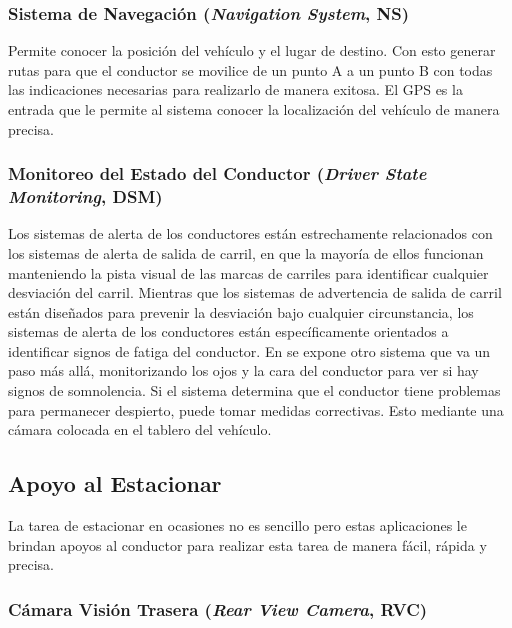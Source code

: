 \subsubsection{Sistema de Navegación {\footnotesize(\textit{Navigation System}, NS)}}

Permite conocer la posición del vehículo y el lugar de destino. Con esto generar rutas para que el conductor se movilice de un punto A a un punto B con todas las indicaciones necesarias para realizarlo de manera exitosa. El GPS es la entrada que le permite al sistema conocer la localización del vehículo de manera precisa.

\subsubsection{Monitoreo del Estado del Conductor {\footnotesize(\textit{Driver State Monitoring}, DSM)}}

Los sistemas de alerta de los conductores están estrechamente relacionados con los sistemas de alerta de salida de carril, en que la mayoría de ellos funcionan manteniendo la pista visual de las marcas de carriles para identificar cualquier desviación del carril. Mientras que los sistemas de advertencia de salida de carril están diseñados para prevenir la desviación bajo cualquier circunstancia, los sistemas de alerta de los conductores están específicamente orientados a identificar signos de fatiga del conductor. En \cite{Velez2015} se expone otro sistema que va un paso más allá, monitorizando los ojos y la cara del conductor para ver si hay signos de somnolencia. Si el sistema determina que el conductor tiene problemas para permanecer despierto, puede tomar medidas correctivas. Esto mediante una cámara colocada en el tablero del vehículo.


\subsection{Apoyo al Estacionar}

La tarea de estacionar en ocasiones no es sencillo pero estas aplicaciones le brindan apoyos al conductor para realizar esta tarea de manera fácil, rápida y precisa.

\subsubsection{Cámara Visión Trasera {\footnotesize(\textit{Rear View Camera}, RVC)}}

